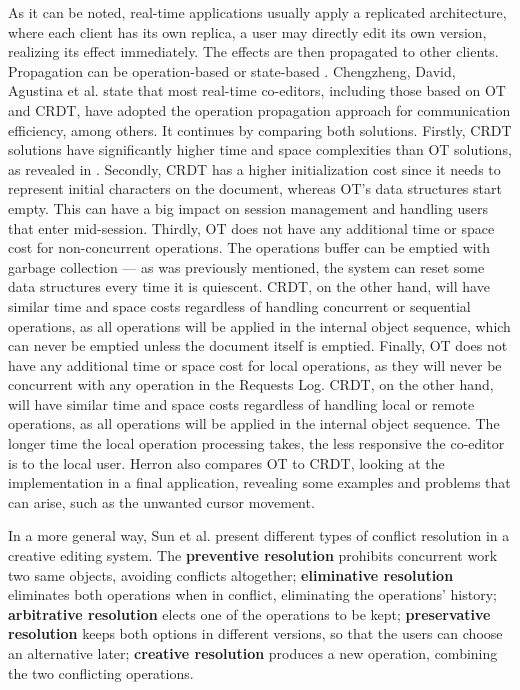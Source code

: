 As it can be noted, real-time applications usually apply a replicated architecture, where each client has its own replica, a user may directly edit its own version, realizing its effect immediately. The effects are then propagated to other clients.
Propagation can be operation-based \cite{Oster2006} \cite{Sun1998-ot} \cite{Sun1998} \cite{Weiss2009} or state-based \cite{Fraser2009}. Chengzheng, David, Agustina et al. \cite{Chengzheng2020} state that most real-time co-editors, including those based on OT and CRDT, have adopted the operation propagation approach for communication efficiency, among others. It continues by comparing both solutions. Firstly, CRDT solutions have significantly higher time and space complexities than OT solutions, as revealed in \cite{Sun2020}. Secondly, CRDT has a higher initialization cost since it needs to represent initial characters on the document, whereas OT's data structures start empty. This can have a big impact on session management and handling users that enter mid-session. Thirdly, OT does not have any additional time or space cost for non-concurrent operations. The operations buffer can be emptied with garbage collection --- as was previously mentioned, the system can reset some data structures every time it is quiescent. CRDT, on the other hand, will have similar time and space costs regardless of handling concurrent or sequential operations, as all operations will be applied in the internal object sequence, which can never be emptied unless the document itself is emptied. Finally, OT does not have any additional time or space cost for local operations, as they will never be concurrent with any operation in the Requests Log. CRDT, on the other hand, will have similar time and space costs regardless of handling local or remote operations, as all operations will be applied in the internal object sequence. The longer time the local operation processing takes, the less responsive the co-editor is to the local user. Herron \cite{Herron-ot-crdt} also compares OT to CRDT, looking at the implementation in a final application, revealing some examples and problems that can arise, such as the unwanted cursor movement.

In a more general way, Sun et al. \cite{Sun2012} present different types of conflict resolution in a creative editing system. The \textbf{preventive resolution} prohibits concurrent work two same objects, avoiding conflicts altogether; \textbf{eliminative resolution} eliminates both operations when in conflict, eliminating the operations' history; \textbf{arbitrative resolution} elects one of the operations to be kept; \textbf{preservative resolution} keeps both options in different versions, so that the users can choose an alternative later; \textbf{creative resolution} produces a new operation, combining the two conflicting operations.

